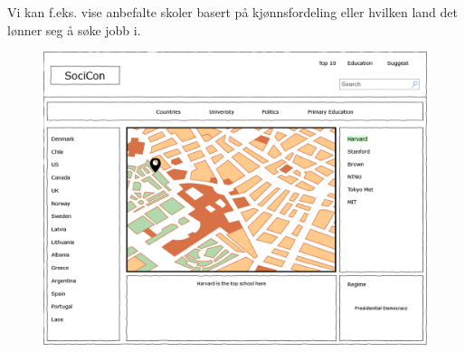 Vi kan f.eks. vise anbefalte skoler basert på kjønnsfordeling eller hvilken land det lønner seg å søke jobb i.

\FigureCounter
\begin{figure}[H]
    \includegraphics[width=\textwidth]{images/milepael1/forsideBigdata.png}
\end{figure}
